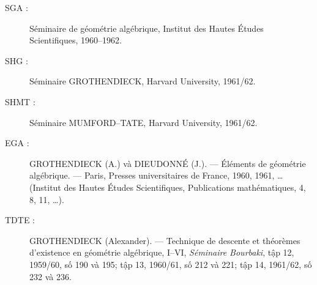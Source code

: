 \begin{description}
\item[SGA :] Séminaire de géométrie algébrique, Institut des Hautes Études
Scientifiques, 1960--1962.

\item[SHG :] Séminaire GROTHENDIECK, Harvard University, 1961/62.

\item[SHMT :] Séminaire MUMFORD--TATE, Harvard University, 1961/62.

\item[EGA :] GROTHENDIECK (A.) và DIEUDONNÉ (J.). --- Éléments de géométrie
algébrique. --- Paris, Presses universitaires de France, 1960, 1961, …
(Institut des Hautes Études Scientifiques, Publications mathématiques, 4, 8,
11, …).

\item[TDTE :] GROTHENDIECK (Alexander). --- Technique de descente et théorèmes
d'existence en géométrie algébrique, I--VI, \emph{Séminaire Bourbaki}, tập 12,
1959/60, số 190 và 195; tập 13, 1960/61, số 212 và 221; tập 14, 1961/62, số
232 và 236.
\end{description}

\par
